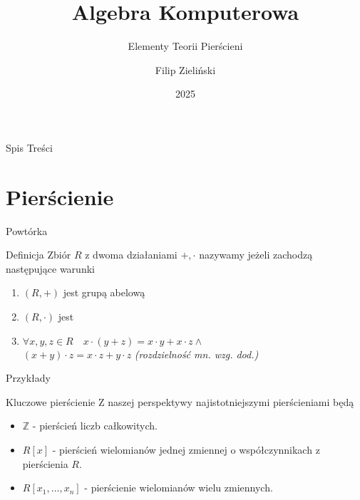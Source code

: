 \documentclass{beamer}
\title{Algebra Komputerowa}
\subtitle{Elementy Teorii Pierścieni \cite{Gleichgewicht,Rusek}}
\author{Filip Zieli\'nski}
\date{2025}
\begin{document}
\begin{frame}
    \titlepage
\end{frame}
 
\begin{frame}{Spis Treści}
    \tableofcontents
\end{frame}

\section{Pierścienie}
\begin{frame}{Powtórka}
    \begin{block}{Definicja}
        Zbiór $R$ z dwoma działaniami $+, \cdot$ nazywamy    jeżeli zachodzą następujące warunki
        \begin{enumerate}
            \item $(R, +)$ jest grupą abelową 
            \item $(R, \cdot)$ jest   
            \item $\forall x,y,z \in R \quad x \cdot (y + z) = x \cdot y + x \cdot z \land $ \\ $(x + y) \cdot z = x \cdot z + y \cdot z$ \hfill \textit{(rozdzielność mn. wzg. dod.)} 
        \end{enumerate}
    \end{block}
\end{frame}

\begin{frame}{Przykłady}
    \begin{exampleblock}{Kluczowe pierścienie}
        Z naszej perspektywy najistotniejszymi pierścieniami będą
        \begin{itemize}
            \item $\mathbb{Z}$ - pierścień liczb całkowitych.
            \item $R[x]$ - pierścień wielomianów jednej zmiennej o współczynnikach z pierścienia $R$.
            \item $R[x_1, \ldots , x_n]$ - pierścienie wielomianów wielu zmiennych.
        \end{itemize}
    \end{exampleblock}
\end{frame}
\end{document}
